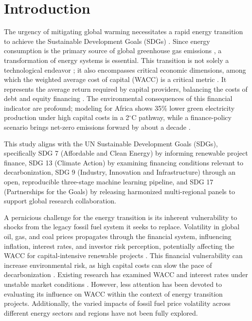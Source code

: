 \section{Introduction}

The urgency of mitigating global warming necessitates a rapid energy transition to achieve the Sustainable Development Goals (SDGs) \cite{messerli2019global}. Since energy consumption is the primary source of global greenhouse gas emissions \cite{BOGDANOV2021120467}, a transformation of energy systems is essential. This transition is not solely a technological endeavor \cite{CHEN20191564}; it also encompasses critical economic dimensions, among which the weighted average cost of capital (WACC) is a critical metric \cite{BACHNER2019100373}. It represents the average return required by capital providers, balancing the costs of debt and equity financing \cite{BACHNER2019100373}. The environmental consequences of this financial indicator are profound; modeling for Africa shows 35\% lower green electricity production under high capital costs in a 2$^\circ$C pathway, while a finance-policy scenario brings net-zero emissions forward by about a decade \cite{ameli2021higher}.

This study aligns with the UN Sustainable Development Goals (SDGs), specifically SDG 7 (Affordable and Clean Energy) by informing renewable project finance, SDG 13 (Climate Action) by examining financing conditions relevant to decarbonization, SDG 9 (Industry, Innovation and Infrastructure) through an open, reproducible three-stage machine learning pipeline, and SDG 17 (Partnerships for the Goals) by releasing harmonized multi-regional panels to support global research collaboration.

A pernicious challenge for the energy transition is its inherent vulnerability to shocks from the legacy fossil fuel system it seeks to replace. Volatility in global oil, gas, and coal prices propagates through the financial system, influencing inflation, interest rates, and investor risk perception, potentially affecting the WACC for capital-intensive renewable projects \cite{melodia2022energy,dobrowolski2022weighted}. This financial vulnerability can increase environmental risk, as high capital costs can slow the pace of decarbonization \cite{egli2019bias,ameli2021higher}. Existing research has examined WACC and interest rates under unstable market conditions \cite{dobrowolski2022weighted}. However, less attention has been devoted to evaluating its influence on WACC within the context of energy transition projects. Additionally, the varied impacts of fossil fuel price volatility across different energy sectors and regions have not been fully explored.


